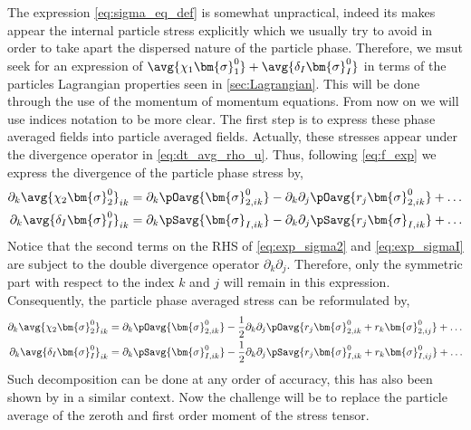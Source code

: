 The expression \ref{eq:sigma_eq_def} is somewhat unpractical, indeed its makes appear the internal particle stress explicitly which we usually try to avoid in order to take apart the dispersed nature of the particle phase. 
Therefore, we msut seek for an expression of $\avg{\chi_1\bm{\sigma}_1^0}
+ \avg{\delta_I \bm{\sigma}_I^0}$ in terms of the particles Lagrangian properties seen in \ref{sec:Lagrangian}.
This will be done through the use of the momentum of momentum equations. 
From now on we will use indices notation to be more clear. 
The first step is to express these phase averaged fields into particle averaged fields. 
Actually, these stresses appear under the divergence operator in \ref{eq:dt_avg_rho_u}. 
Thus, following \ref{eq:f_exp} we express the divergence of the particle phase stress by, 
\begin{align}
    \label{eq:exp_sigma2}
    \partial_k \avg{\chi_2\bm{\sigma}_2^0}_{ik}
    &=  \partial_k\pOavg{ \bm{\sigma}^0_{2,ik}}
    - \partial_k\partial_j
    \pOavg{ r_j\bm{\sigma}^0_{2,ik}}        
    + \ldots  \\
    \label{eq:exp_sigmaI}
    \partial_k \avg{\delta_I \bm{\sigma}_I^0}_{ik} 
    &=  \partial_k\pSavg{ \bm{\sigma}_{I,ik} }
        - \partial_k\partial_j \pSavg{ r_j \bm{\sigma}_{I,ik} }
        + \ldots  
\end{align}
Notice that the second terms on the RHS of \ref{eq:exp_sigma2} and \ref{eq:exp_sigmaI} are subject to the double divergence operator $\partial_k\partial_j$. 
Therefore, only the symmetric part with respect to the index $k$ and $j$ will remain in this expression. 
Consequently, the particle phase averaged stress can be reformulated by, 
\begin{align}
    \label{eq:exp_sigma22}
    \partial_k \avg{\chi_2\bm{\sigma}_2^0}_{ik}
    &=  \partial_k\pOavg{ \bm{\sigma}^0_{2,ik}}
    -\frac{1}{2} \partial_k\partial_j
    \pOavg{ r_j \bm{\sigma}^0_{2,ik} + r_k\bm{\sigma}^0_{2,ij}}
    + \ldots  \\
    \label{eq:exp_sigmaI2}
    \partial_k \avg{\delta_I \bm{\sigma}_I^0}_{ik} 
    &=  \partial_k\pSavg{ \bm{\sigma}_{I,ik}^0 }
        -\frac{1}{2} \partial_k\partial_j \pSavg{ r_j \bm{\sigma}_{I,ik}^0+r_k \bm{\sigma}_{I,ij}^0 }
        + \ldots  
\end{align}
Such decomposition can be done at any order of accuracy, this has also been shown by \citet[Appendix A]{nott2011suspension} in a similar context. 
Now the challenge will be to replace the particle average of the zeroth and first order moment of the stress tensor. 
